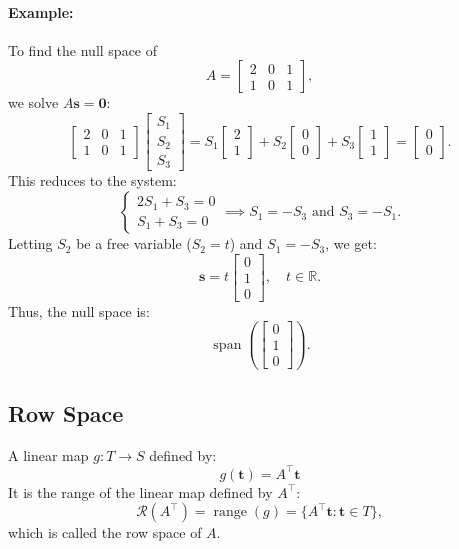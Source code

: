 \documentclass{article}
\begin{document}
\paragraph*{Example:}
To find the null space of 
\[
A = \begin{bmatrix}
    2 & 0 & 1 \\
    1 & 0 & 1
\end{bmatrix},
\]
we solve \( A\mathbf{s} = \mathbf{0} \):
\[
\begin{bmatrix}
    2 & 0 & 1 \\
    1 & 0 & 1
\end{bmatrix}
\begin{bmatrix}
    S_1 \\
    S_2 \\
    S_3
\end{bmatrix}
= S_1\begin{bmatrix}2 \\ 1\end{bmatrix} 
+ S_2\begin{bmatrix}0 \\ 0\end{bmatrix} 
+ S_3\begin{bmatrix}1 \\ 1\end{bmatrix} 
= \begin{bmatrix}0 \\ 0\end{bmatrix}.
\]
This reduces to the system:
\[
\begin{cases}
2S_1 + S_3 = 0 \\
S_1 + S_3 = 0
\end{cases} \implies S_1 = -S_3 \text{ and } S_3 = -S_1.
\]
Letting \( S_2 \) be a free variable (\( S_2 = t \)) and \( S_1 = -S_3 \), we get:
\[
\mathbf{s} = t\begin{bmatrix}0 \\ 1 \\ 0\end{bmatrix}, \quad t \in \mathbb{R}.
\]
Thus, the null space is:
\[
\operatorname{span}\left( \begin{bmatrix}0 \\ 1 \\ 0\end{bmatrix} \right).
\]

\vspace{2cm}

\subsection{Row Space}
A linear map \( g: T \rightarrow S \) defined by:
\[
g(\mathbf{t}) = A^\top \mathbf{t}
\]
It is the range of the linear map defined by \( A^\top \):
\[
\mathcal{R}(A^\top) = \operatorname{range}(g) = \{ A^\top \mathbf{t} : \mathbf{t} \in T \},
\]
which is called the row space of \( A \).
\end{document}
